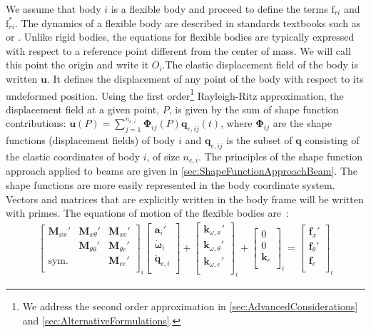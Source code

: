 \documentclass[wes, manuscript]{copernicus}
\renewcommand{\v}[1]{\boldsymbol{#1}}
\newcommand{\m}[1]{\boldsymbol{#1}}
\newcommand{\M} {{\m{M}}}
\newcommand{\kanef}{\mathrm{f}}
\begin{document}
We assume that body $i$ is a flexible body and proceed to define the terms $\kanef_{ri}$ and $\kanef_{ri}^*$.
The dynamics of a flexible body are described in standards textbooks 
such as \cite{shabana:book} or \cite{Schwertassek:book}.
Unlike rigid bodies, the equations for flexible bodies are typically expressed with respect to a reference point different from the center of mass. We will call this point the origin and write it $O_i$.The elastic displacement field of the body is written $\v{u}$. It defines the displacement of any point of the body with respect to its undeformed position. Using the first order\footnote{We address the second order approximation in \autoref{sec:AdvancedConsiderations} and \autoref{sec:AlternativeFormulations}.} Rayleigh-Ritz approximation, the displacement field at a given point, $P$, is given by the sum of shape function contributions: $\v{u}(P)=\sum_{j=1}^{n_{e,i}} \v{\Phi}_{ij}(P) \v{q}_{e,ij}(t)$, where $\m{\Phi}_{ij}$ are the shape functions (displacement fields) of body $i$ and $\v{q}_{e,ij}$ is the subset of $\v{q}$ consisting of the elastic coordinates of body $i$, of size $n_{e,i}$. The principles of the shape function approach applied to beams are given in \autoref{sec:ShapeFunctionApproachBeam}. The shape functions are more easily represented in the body coordinate system.  
Vectors and matrices that are explicitly written in the body frame will be written with primes.
The equations of motion of the flexible bodies are~\citep{Wallrapp:1994}:
\begin{align}
    \begin{bmatrix}
       \M_{xx}'    & \M_{x \theta}' & \M_{ x e }' \\
                   & \M_{\theta \theta}'   & \M_{\theta e}'   \\
       \text{sym.} &            & \M_{e e}'  \\
    \end{bmatrix}_i
    \begin{bmatrix}
      \v{a}_i' \\
      \v{\dot{\omega}}_i \\
      \v{\ddot{q}}_{e,i} \\
    \end{bmatrix}
      +
    \begin{bmatrix}
      \v{k}_{\omega, x}' \\
      \v{k}_{\omega, \theta}' \\
      \v{k}_{\omega, e}' \\
    \end{bmatrix}_i
      +
    \begin{bmatrix}
      0 \\
      0 \\
      \v{k}_{e}\\
    \end{bmatrix}_i
      =
    \begin{bmatrix}
      \v{f}_{x}' \\
      \v{f}_{\theta}' \\
      \v{f}_{e}\\
    \end{bmatrix}_i
    \label{eq:EOMFlexibleBody}
\end{align}
\end{document}
